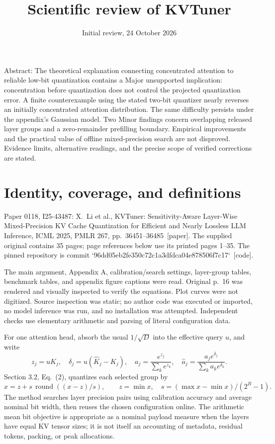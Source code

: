 \documentclass[10pt]{article}
\title{Scientific review of KVTuner}
\author{}
\date{Initial review, 24 October 2026}
\begin{document}
\maketitle
Abstract: The theoretical explanation connecting concentrated attention to reliable low-bit quantization contains a Major unsupported implication: concentration before quantization does not control the projected quantization error. A finite counterexample using the stated two-bit quantizer nearly reverses an initially concentrated attention distribution. The same difficulty persists under the appendix’s Gaussian model. Two Minor findings concern overlapping released layer groups and a zero-remainder prefilling boundary. Empirical improvements and the practical value of offline mixed-precision search are not disproved. Evidence limits, alternative readings, and the precise scope of verified corrections are stated.\par
\section*{Identity, coverage, and definitions}
Paper 0118, I25-43487: X. Li et al., KVTuner: Sensitivity-Aware Layer-Wise Mixed-Precision KV Cache Quantization for Efficient and Nearly Lossless LLM Inference, ICML 2025, PMLR 267, pp. 36451–36485 [paper]. The supplied original contains 35 pages; page references below use its printed pages 1–35. The pinned repository is commit `96dd05eb2fe350c72c1a3dfdca04e878506f7c17` [code].\par
The main argument, Appendix A, calibration/search settings, layer-group tables, benchmark tables, and appendix figure captions were read. Original p. 16 was rendered and visually inspected to verify the equations. Plot curves were not digitized. Source inspection was static; no author code was executed or imported, no model inference was run, and no installation was attempted. Independent checks use elementary arithmetic and parsing of literal configuration data.\par
For one attention head, absorb the usual \(1/\sqrt D\) into the effective query \(u\), and write \[z_j=uK_j,\quad \delta_j=u(\widehat K_j-K_j),\quad
 a_j=\frac{e^{z_j}}{\sum_k e^{z_k}},\quad
 \widehat a_j=\frac{a_je^{\delta_j}}{\sum_k a_ke^{\delta_k}}.
 \tag{1.1}\] Section 3.2, Eq. (2), quantizes each selected group by \[\widehat x=z+s\,\operatorname{round}((x-z)/s),\qquad
 z=\min x,\quad s=(\max x-\min x)/(2^B-1).
 \tag{1.2}\] The method searches layer precision pairs using calibration accuracy and average nominal bit width, then reuses the chosen configuration online. The arithmetic mean bit objective is appropriate as a nominal payload measure when the layers have equal KV tensor sizes; it is not itself an accounting of metadata, residual tokens, packing, or peak allocations.\par
\end{document}
